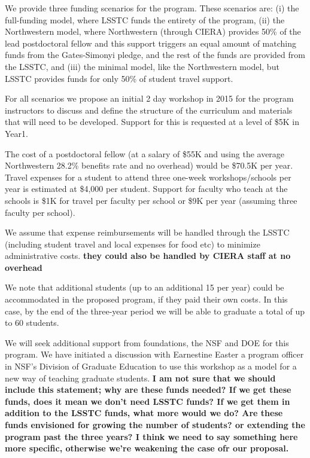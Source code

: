 \documentclass[nofootbib,floatfix,11pt]{article}
\begin{document}
We provide three funding scenarios for the program. These scenarios are: (i) the full-funding model, where LSSTC funds the entirety of the  program, (ii) the Northwestern model, where Northwestern (through CIERA) provides 50\% of the lead postdoctoral fellow and this support triggers an equal amount of matching funds from the Gates-Simonyi pledge, and the rest of the funds are provided from the LSSTC, and (iii) the minimal model, like the Northwestern model, but LSSTC provides funds for only 50\% of student travel support. 

For all scenarios we propose an initial 2 day workshop in 2015 for the program instructors to discuss and define the structure of the curriculum and materials that will need to be developed. Support for this is requested at a level of \$5K in Year1.

The cost of a postdoctoral fellow (at a salary of \$55K and using the average Northwestern 28.2\% benefits rate and no overhead) would be \$70.5K per year. Travel expenses for a student to attend three one-week workshops/schools per year is estimated at \$4,000 per student. Support for faculty who teach at the schools is \$1K for travel per faculty per school or \$9K per year (assuming three faculty per school).

We assume that expense reimbursements will be handled through the LSSTC (including student travel and local expenses for food etc) to minimize administrative costs. {\bf they could also be handled by CIERA staff at no overhead} 

We note that additional students (up to an additional 15 per year) could be accommodated in the proposed program, if they paid their own costs. In this case, by the end of the three-year period we will be able to graduate a total of up to 60 students. 

We will seek additional support from foundations, the NSF and DOE for this program. We have initiated a discussion with Earnestine Easter a program officer in NSF's Division of Graduate  Education  to use this workshop as a model for a new way of teaching graduate students. {\bf I am not sure that we should include this statement; why are these funds needed? If we get these funds, does it mean we don't need LSSTC funds? If we get them in addition to the LSSTC funds, what more would we do? Are these funds envisioned for growing the number of students? or extending the program past the three years? I think we need to say something here more specific, otherwise we're weakening the case ofr our proposal. } 
\end{document}
